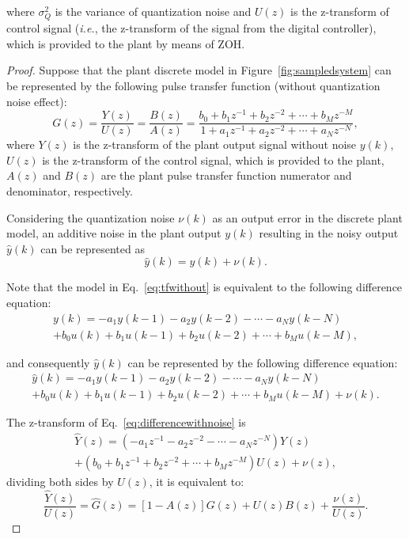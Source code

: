 \documentclass{sig-alternate-05-2015}
\begin{document}
\noindent where $\sigma_{Q}^{2}$ is the variance of quantization noise and $U(z)$ is the z-transform of control signal ({\it i.e.}, the z-transform of the signal from the digital controller), which is provided to the plant by means of ZOH.
%
\begin{proof}
Suppose that the plant discrete model in Figure~\ref{fig:sampledsystem} can be represented by the following pulse transfer function (without quantization noise effect): 
\begin{equation}
\label{eq:tfwithout}
G(z)=\frac{Y(z)}{U(z)}=\frac{B(z)}{A(z)}=\frac{b_{0}+b_{1}z^{-1}+b_{2}z^{-2}+\cdots+b_{M}z^{-M}}{1+a_{1}z^{-1}+a_{2}z^{-2}+\cdots+a_{N}z^{-N}},
\end{equation}
\noindent where $Y(z)$ is the z-transform of the plant output signal without noise $y(k)$, $U(z)$ is the z-transform of the control signal, which is provided to the plant, $A(z)$ and $B(z)$ are the plant pulse transfer function numerator and denominator, respectively.

Considering the quantization noise $\nu(k)$ as an output error in the discrete plant model, an additive noise in the plant output $y(k)$ resulting in the noisy output $\hat{y}(k)$ can be represented as
%
\begin{equation}
\hat{y}(k)=y(k)+\nu(k).
\end{equation}

Note that the model in Eq.~\eqref{eq:tfwithout} is equivalent to the following difference equation:
%
\begin{equation}
\begin{split}
y(k)=-a_{1}y(k-1)-a_{2}y(k-2)-\cdots - a_{N}y(k-N)\\
+b_{0}u(k)+b_{1}u(k-1)+b_{2}u(k-2)+\cdots+b_{M}u(k-M),
\end{split}
\end{equation}

\noindent and consequently $\hat{y}(k)$ can be represented by the following difference equation:
%
\begin{equation}
\label{eq:differencewithnoise}
\begin{split}
\hat{y}(k)=-a_{1}y(k-1)-a_{2}y(k-2)-\cdots - a_{N}y(k-N)\\
+b_{0}u(k)+b_{1}u(k-1)+b_{2}u(k-2)+\cdots+b_{M}u(k-M)+\nu(k).
\end{split}
\end{equation}

The z-transform of Eq.~\eqref{eq:differencewithnoise} is
%
\begin{equation}
\begin{split}
\hat{Y}(z)=(-a_{1}z^{-1}-a_{2}z^{-2}-\cdots-a_{N}z^{-N})Y(z)\\
+(b_{0}+b_{1}z^{-1}+b_{2}z^{-2}+\cdots+b_{M}z^{-M})U(z)+\nu(z),
\end{split}
\end{equation}
dividing both sides by $U(z)$, it is equivalent to:
\begin{equation}
\frac{\hat{Y}(z)}{U(z)}=\hat{G}(z)=[1-A(z)]G(z)+U(z)B(z)+\frac{\nu(z)}{U(z)}.
\end{equation}


\end{proof}
\end{document}
